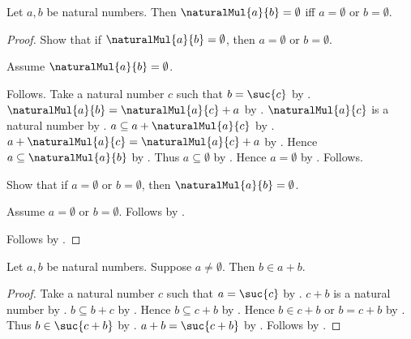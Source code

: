 \begin{proposition}\label{spike15_natural_multiplication_zero_iff}
    Let $a,b$ be natural numbers.
    Then $\naturalMul{a}{b}=\emptyset$ iff
        $a=\emptyset$ or $b=\emptyset$.
\end{proposition}
\begin{proof}
    Show that if $\naturalMul{a}{b}=\emptyset$, then
        $a=\emptyset$ or $b=\emptyset$.
    \begin{subproof}
        Assume $\naturalMul{a}{b}=\emptyset$.
        \begin{byCase}
                Follows.
                Take a natural number $c$ such that $b=\suc{c}$
                    by .
                $\naturalMul{a}{b}=\naturalMul{a}{c}+a$
                    by .
                $\naturalMul{a}{c}$ is a natural number
                    by .
                $a\subseteq a+\naturalMul{a}{c}$
                    by .
                $a+\naturalMul{a}{c}=\naturalMul{a}{c}+a$
                    by .
                Hence $a\subseteq\naturalMul{a}{b}$
                    by \auto.
                Thus $a\subseteq\emptyset$ by \auto.
                Hence $a=\emptyset$
                    by .
                Follows.
        \end{byCase}
    \end{subproof}
    Show that if $a=\emptyset$ or $b=\emptyset$, then
        $\naturalMul{a}{b}=\emptyset$.
    \begin{subproof}
        Assume $a=\emptyset$ or $b=\emptyset$.
        Follows by
            .
    \end{subproof}
    Follows by \auto.
\end{proof}

\begin{proposition}\label{spike15_positive_summand_makes_strict_sum}
    Let $a,b$ be natural numbers.
    Suppose $a\neq\emptyset$.
    Then $b\in a+b$.
\end{proposition}
\begin{proof}
    Take a natural number $c$ such that $a=\suc{c}$
        by .
    $c+b$ is a natural number by .
    $b\subseteq b+c$ by .
    Hence $b\subseteq c+b$ by .
    Hence $b\in c+b$ or $b=c+b$
        by .
    Thus $b\in\suc{c+b}$ by .
    $a+b=\suc{c+b}$ by .
    Follows by \auto.
\end{proof}

